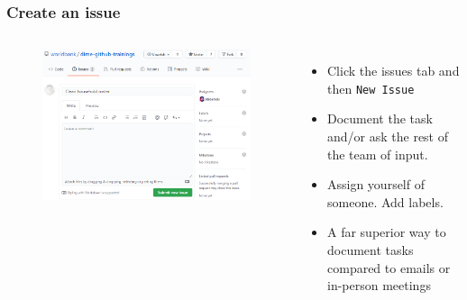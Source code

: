 \documentclass[aspectratio=169]{beamer} %
\begin{document}
\begin{frame}
	\frametitle{Create an issue}
	\begin{columns}[c]


		\vspace{-.5cm}
		\begin{figure}
			\centering
			\includegraphics[width=\textwidth]{./img/create-issue.png}
		\end{figure}
		
		
		\begin{itemize}
			\setlength\itemsep{1em}
			\item Click the issues tab and then \texttt{New Issue}
			\item Document the task and/or ask the rest of the team of input.
			\item Assign yourself of someone. Add labels.
			\item A far superior way to document tasks compared to emails or in-person meetings
		\end{itemize}
			
	\end{columns}	
	
\end{frame}
\end{document}
